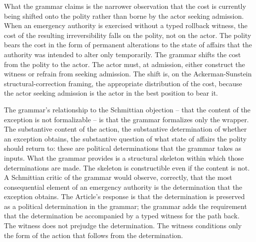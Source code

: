 What the grammar claims is the narrower observation that the cost is currently being shifted onto the polity
rather than borne by the actor seeking admission.
When an emergency authority is exercised without a typed rollback witness,
the cost of the resulting irreversibility falls on the polity, not on the actor.
The polity bears the cost in the form of permanent alterations to the state of affairs that the authority was
intended to alter only temporarily.
The grammar shifts the cost from the polity to the actor.
The actor must, at admission, either construct the witness or refrain from seeking admission.
The shift is, on the Ackerman-Sunstein structural-correction framing, the appropriate distribution of the cost,
because the actor seeking admission is the actor in the best position to bear it.

The grammar's relationship to the Schmittian objection -- that the content of the exception is not formalizable --
is that the grammar formalizes only the wrapper.
The substantive content of the action, the substantive determination of whether an exception obtains,
the substantive question of what state of affairs the polity should return to: these are political determinations
that the grammar takes as inputs.
What the grammar provides is a structural skeleton within which those determinations are made.
The skeleton is constructible even if the content is not.
A Schmittian critic of the grammar would observe, correctly, that the most consequential element of an emergency
authority is the determination that the exception obtains.
The Article's response is that the determination is preserved as a political determination in the grammar;
the grammar adds the requirement that the determination be accompanied by a typed witness for the path back.
The witness does not prejudge the determination.
The witness conditions only the form of the action that follows from the determination.

